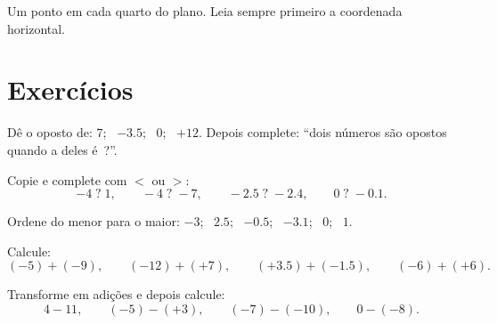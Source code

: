 \begin{omfigure}

{\small Um ponto em cada quarto do plano. Leia sempre primeiro a
coordenada horizontal.}
\end{omfigure}

\section{Exercícios}

\begin{exercise}[$\star$]\label{exo:g7:negatives:1}
Dê o oposto de: $7$; \ $-3.5$; \ $0$; \ $+12$. Depois complete: ``dois
números são opostos quando a  deles é~?''.
\end{exercise}

\begin{exercise}[$\star$]\label{exo:g7:negatives:2}
Copie e complete com $<$ ou $>$:
\[
-4 \;?\; 1, \qquad
-4 \;?\; -7, \qquad
-2.5 \;?\; -2.4, \qquad
0 \;?\; -0.1 .
\]
\end{exercise}

\begin{exercise}[$\star$]\label{exo:g7:negatives:3}
Ordene do menor para o maior: $-3$; \ $2.5$; \ $-0.5$; \ $-3.1$;
\ $0$; \ $1$.
\end{exercise}

\begin{exercise}[$\star$]\label{exo:g7:negatives:4}
Calcule:
\[
(-5) + (-9), \qquad
(-12) + (+7), \qquad
(+3.5) + (-1.5), \qquad
(-6) + (+6).
\]
\end{exercise}

\begin{exercise}[$\star$]\label{exo:g7:negatives:5}
Transforme em adições e depois calcule:
\[
4 - 11, \qquad
(-5) - (+3), \qquad
(-7) - (-10), \qquad
0 - (-8).
\]
\end{exercise}

